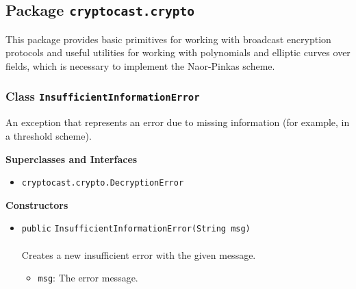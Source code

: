 \subsection{Package \lstinline!cryptocast.crypto!}
This package provides basic primitives for working with broadcast encryption protocols
 and useful utilities for working with polynomials and elliptic curves over fields, which
 is necessary to implement the Naor-Pinkas scheme.

\subsubsection{Class \lstinline|InsufficientInformationError|}
An exception that represents an error due to missing information (for
 example, in a threshold scheme). \\
\noindent\begin{minipage}[t]{5cm}
\vspace{0.3em}
\hspace*{2em}
\vspace{0.3em}
\end{minipage}



\textbf{\sffamily Superclasses and Interfaces}
\begin{itemize}
\item \lstinline|cryptocast.crypto.DecryptionError|
\end{itemize}


\textbf{\sffamily Constructors}
\begin{itemize}
\item \lstinline|public| \lstinline|InsufficientInformationError|\lstinline|(String msg)|\\ \\[-0.6em]
Creates a new insufficient error with the given message.
\begin{itemize}
\item \lstinline|msg|: The error message.
\end{itemize}



\end{itemize}


